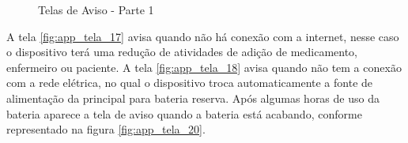 \begin{apendicesenv}
\begin{figure}[H]
    \centering
    \caption{Telas de Aviso - Parte 1 }\label{fig:telas_14_15_16}
\end{figure}

A tela \ref{fig:app_tela_17} avisa quando não há conexão com a internet, nesse caso o dispositivo terá uma redução de atividades de adição de medicamento, enfermeiro ou paciente. A tela \ref{fig:app_tela_18} avisa quando não tem a conexão com a rede elétrica, no qual o dispositivo troca automaticamente a fonte de alimentação da principal para bateria reserva. Após algumas horas de uso da bateria aparece a tela de aviso quando a bateria está acabando, conforme representado na figura \ref{fig:app_tela_20}.


\end{apendicesenv}
